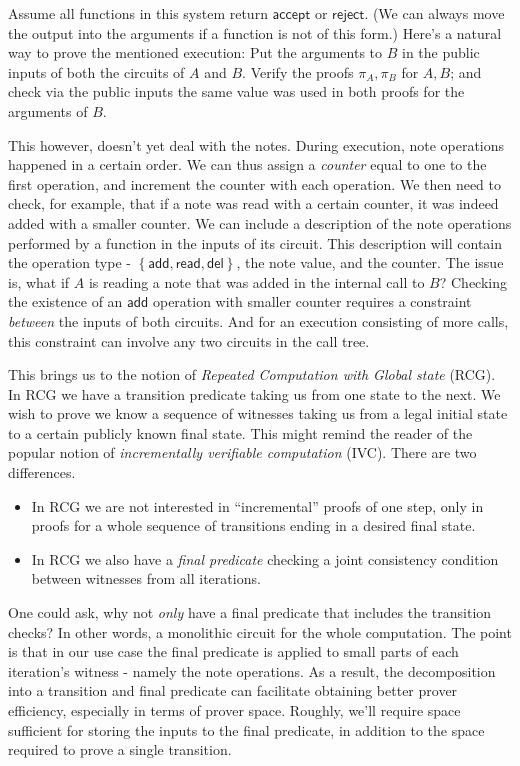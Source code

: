 \documentclass[11pt]{article} %
\newcommand{\rej}{\ensuremath{\mathsf{reject}}\xspace}
\newcommand{\acc}{\ensuremath{\mathsf{accept}}\xspace}
\newcommand{\prf}{\ensuremath{\mathsf{\pi}}\xspace}
\newcommand{\set}[1]{\ensuremath{\left\{#1\right\}}\xspace}
\newcommand{\add}{\ensuremath{\mathsf{add}}\xspace}
\newcommand{\del}{\ensuremath{\mathsf{del}}\xspace}
\renewcommand{\read}{\ensuremath{\mathsf{read}}\xspace}
\begin{document}
Assume all functions in this system return \acc or \rej. (We can always move the output into the arguments if a function is not of this form.)
Here's a natural way to prove the mentioned execution: Put the arguments to $B$ in the public inputs of both the circuits of $A$ and $B$.
Verify the proofs $\prf_A,\prf_B$ for $A,B$; and check via the public inputs the same value was used in both proofs for the arguments of $B$.

This however, doesn't yet deal with the notes. During execution, note operations happened in a certain order.
We can thus assign a \emph{counter} equal to one to the first operation, and increment the counter with each operation.
We then need to check, for example, that if a note was read with a certain counter, it was indeed added
with a smaller counter.
We can include a description of the note operations performed by a function in the inputs of its circuit. This description will contain the operation type - \set{\add,\read,\del}, the note value, and the counter.
The issue is, what if $A$ is reading a note that was added in the internal call to $B$?
Checking the existence of an $\add$ operation with smaller counter requires a constraint \emph{between} the inputs of both circuits. And for an execution consisting of more calls, this constraint can involve any two circuits in the call tree. 

This brings us to the notion of \emph{Repeated Computation with Global state} (RCG). In RCG we have a transition predicate taking us from one state to the next. We wish to prove we know a sequence of witnesses taking us from a legal initial state to a certain publicly known final state. This might remind the reader of the popular notion of \emph{incrementally verifiable computation} (IVC). There are two differences.

\begin{itemize}
 \item 
In RCG we are not interested in ``incremental'' proofs of one step, only in proofs for a whole
sequence of transitions ending in a desired final state.

\item In RCG we also have a \emph{final predicate} checking a joint consistency condition between witnesses from all iterations.

\end{itemize}
 One could ask, why not \emph{only} have a final predicate that includes the transition checks? In other words, a monolithic circuit for the whole computation.
The point is that in our use case the final predicate is applied to small parts of each iteration's witness - namely the note operations. As a result, the decomposition into a transition and final predicate can facilitate obtaining better prover efficiency, especially in terms of prover space.
Roughly, we'll require space sufficient for storing the inputs to the final predicate, in addition to the space required to prove a single transition.
\end{document}
